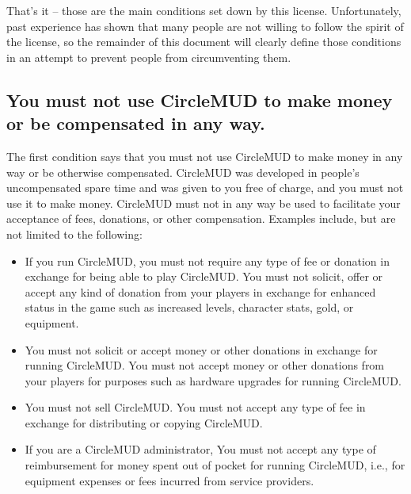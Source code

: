 \documentclass[11pt]{article}
\begin{document}
That's it -- those are the main conditions set down by this license. Unfortunately, past experience has shown that many people are not willing to follow the spirit of the license, so the remainder of this document will clearly define those conditions in an attempt to prevent people from circumventing them.

\subsection{You must not use CircleMUD to make money or be compensated in any way.}
The first condition says that you must not use CircleMUD to make money in any way or be otherwise compensated.  CircleMUD was developed in people's uncompensated spare time and was given to you free of charge, and you must not use it to make money.  CircleMUD must not in any way be used to facilitate your acceptance of fees, donations, or other compensation. Examples include, but are not limited to the following:
\begin{itemize}
\item If you run CircleMUD, you must not require any type of fee or donation in exchange for being able to play CircleMUD.  You must not solicit, offer or accept any kind of donation from your players in exchange for enhanced status in the game such as increased levels, character stats, gold, or equipment.
\item You must not solicit or accept money or other donations in exchange for running CircleMUD.  You must not accept money or other donations from your players for purposes such as hardware upgrades for running CircleMUD.
\item You must not sell CircleMUD.  You must not accept any type of fee in exchange for distributing or copying CircleMUD.
\item If you are a CircleMUD administrator, You must not accept any type of reimbursement for money spent out of pocket for running CircleMUD, i.e., for equipment expenses or fees incurred from service providers.
\end{itemize}
\end{document}
